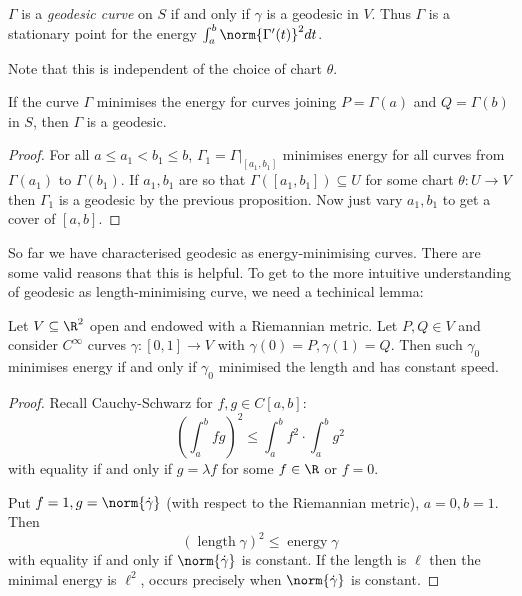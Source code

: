 \documentclass[a4paper]{article}
\theoremstyle{definition}
\begin{document}
\begin{definition}[Geodesic]
  \(\Gamma\) is a \emph{geodesic curve} on \(S\) if and only if \(\gamma\) is a geodesic in \(V\). Thus \(\Gamma\) is a stationary point for the energy \(\int_a^b \norm{\Gamma'(t)}^2 dt\).
\end{definition}

Note that this is independent of the choice of chart \(\theta\).

\begin{corollary}
  If the curve \(\Gamma\) minimises the energy for curves joining \(P = \Gamma(a)\) and \(Q = \Gamma(b)\) in \(S\), then \(\Gamma\) is a geodesic.
\end{corollary}

\begin{proof}
  For all \(a \leq a_1 < b_1 \leq b\), \(\Gamma_1 = \Gamma|_{[a_1, b_1]}\) minimises energy for all curves from \(\Gamma(a_1)\) to \(\Gamma(b_1)\). If \(a_1, b_1\) are so that \(\Gamma([a_1, b_1]) \subseteq U\) for some chart \(\theta: U \to V\) then \(\Gamma_1\) is a geodesic by the previous proposition. Now just vary \(a_1, b_1\) to get a cover of \([a, b]\).
\end{proof}

So far we have characterised geodesic as energy-minimising curves. There are some valid reasons that this is helpful. To get to the more intuitive understanding of geodesic as length-minimising curve, we need a techinical lemma:

\begin{lemma}
  Let \(V \subseteq \R^2\) open and endowed with a Riemannian metric. Let \(P, Q \in V\) and consider \(C^\infty\) curves \(\gamma: [0, 1] \to V\) with \(\gamma(0) = P, \gamma(1) = Q\). Then such \(\gamma_0\) minimises energy if and only if \(\gamma_0\) minimised the length and has constant speed.
\end{lemma}

\begin{proof}
  Recall Cauchy-Schwarz for \(f, g \in C[a, b]\):
  \[
    \left( \int_a^b fg \right)^2 \leq \int_a^b f^2 \cdot \int_a^b g^2
  \]
  with equality if and only if \(g = \lambda f\) for some \(f \in \R\) or \(f = 0\).

  Put \(f = 1, g = \norm{\dot \gamma}\) (with respect to the Riemannian metric), \(a = 0, b = 1\). Then
  \[
    (\operatorname{length} \gamma)^2 \leq \operatorname{energy} \gamma
  \]
  with equality if and only if \(\norm{\dot \gamma}\) is constant. If the length is \(\ell\) then the minimal energy is \(\ell^2\), occurs precisely when \(\norm{\dot \gamma}\) is constant.
\end{proof}
\end{document}
